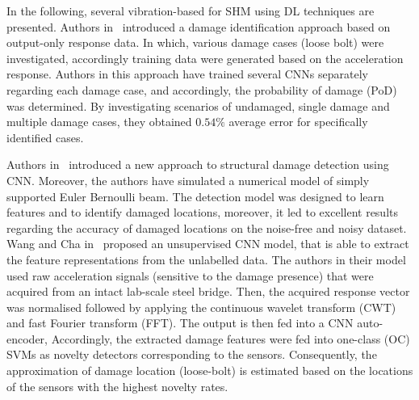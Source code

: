 In the following, several vibration-based for SHM using DL techniques are presented.
Authors in~\cite{Abdeljaber2017} introduced a damage identification approach based on output-only response data.
In which, various damage cases (loose bolt) were investigated, accordingly training data were generated based on the acceleration response.
Authors in this approach have trained several CNNs separately regarding each damage case, and accordingly, the probability of damage (PoD) was determined.
By investigating scenarios of undamaged, single damage and multiple damage cases, they obtained \(0.54\%\) average error for specifically identified cases.

Authors in~\cite{Lin2017} introduced a new approach to structural damage detection using CNN.
Moreover, the authors have simulated a numerical model of simply supported Euler Bernoulli beam.
The detection model was designed to learn features and to identify damaged locations, moreover, it led to excellent results regarding the accuracy of damaged locations on the noise-free and noisy dataset.
Wang and Cha in~\cite{Cha2018} proposed an unsupervised CNN model, that is able to extract the feature representations from the unlabelled data.
The authors in their model used raw acceleration signals (sensitive to the damage presence) that were acquired from an intact lab-scale steel bridge.
Then, the acquired response vector was normalised followed by applying the continuous wavelet transform (CWT) and fast Fourier transform (FFT).
The output is then fed into a CNN auto-encoder,
Accordingly, the extracted damage features were fed into one-class (OC) SVMs as novelty detectors corresponding to the sensors.
Consequently, the approximation of damage location (loose-bolt) is estimated based on the locations of the sensors with the highest novelty rates.


